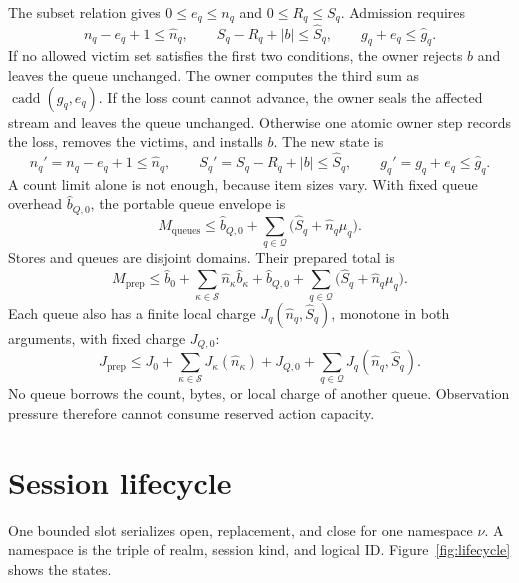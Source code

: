 \documentclass[11pt,a4paper]{article}
\theoremstyle{definition}
\newcommand{\cadd}{\operatorname{cadd}}
\begin{document}
The subset relation gives $0\leq e_q\leq n_q$ and $0\leq R_q\leq S_q$. Admission
requires
\begin{equation}\label{eq:queue-admit}
n_q-e_q+1\leq\hat n_q,\qquad S_q-R_q+|b|\leq\hat S_q,\qquad
g_q+e_q\leq\hat g_q.
\end{equation}
If no allowed victim set satisfies the first two conditions, the owner rejects $b$ and
leaves the queue unchanged. The owner computes the third sum as $\cadd(g_q,e_q)$. If
the loss count cannot advance, the owner seals the affected stream and leaves the
queue unchanged. Otherwise one atomic owner step records the loss, removes the
victims, and installs $b$. The new state is
\begin{equation}\label{eq:queue-after}
n_q'=n_q-e_q+1\leq\hat n_q,\qquad S_q'=S_q-R_q+|b|\leq\hat S_q,\qquad
g_q'=g_q+e_q\leq\hat g_q.
\end{equation}
A count limit alone is not enough, because item sizes vary. With fixed queue overhead
$\hat b_{Q,0}$, the portable queue envelope is
\begin{equation}\label{eq:queue-envelope}
M_{\mathrm{queues}}\leq\hat b_{Q,0}+\sum_{q\in\mathcal{Q}}
\bigl(\hat S_q+\hat n_q\mu_q\bigr).
\end{equation}
Stores and queues are disjoint domains. Their prepared total is
\begin{equation}\label{eq:prepared-memory}
M_{\mathrm{prep}}\leq\hat b_0+\sum_{\kappa\in\mathcal{S}}\hat n_\kappa\hat b_\kappa
+\hat b_{Q,0}+\sum_{q\in\mathcal{Q}}\bigl(\hat S_q+\hat n_q\mu_q\bigr).
\end{equation}
Each queue also has a finite local charge $J_q(\hat n_q,\hat S_q)$, monotone in both
arguments, with fixed charge $J_{Q,0}$:
\begin{equation}\label{eq:prepared-local}
J_{\mathrm{prep}}\leq J_0+\sum_{\kappa\in\mathcal{S}}J_\kappa(\hat n_\kappa)
+J_{Q,0}+\sum_{q\in\mathcal{Q}}J_q(\hat n_q,\hat S_q).
\end{equation}
No queue borrows the count, bytes, or local charge of another queue. Observation
pressure therefore cannot consume reserved action capacity.

\section{Session lifecycle}


One bounded slot serializes open, replacement, and close for one namespace $\nu$. A
namespace is the triple of realm, session kind, and logical ID.
Figure~\ref{fig:lifecycle} shows the states.
\end{document}
